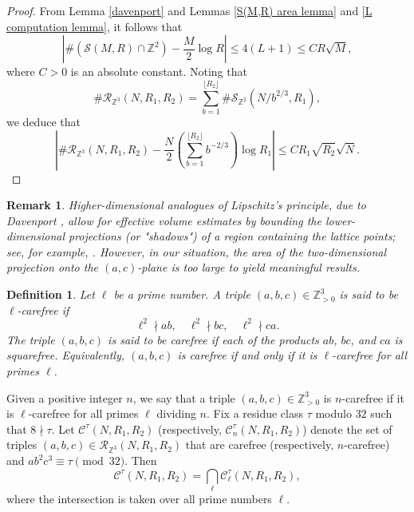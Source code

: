 \documentclass[table]{amsart}
\newtheorem{definition}[theorem]{Definition}
\newtheorem{remark}[theorem]{Remark}
\newcommand{\Z}{\mathbb{Z}}
\numberwithin{equation}{section}
\begin{document}
\begin{proof}
From Lemma \ref{davenport} and Lemmas \ref{S(M,R) area lemma} and \ref{L computation lemma}, it follows that
\[\left|\# \left(\mathcal{S}(M, R)\cap \Z^2\right)-\frac{M}{2}\log R\right|\leq 4(L+1)\leq  C R \sqrt{M},\] where $C>0$ is an absolute constant.
Noting that 
\[\# \mathcal{R}_{\Z^3}(N, R_1, R_2)=\sum_{b=1}^{\lfloor R_2\rfloor} \# \mathcal{S}_{\Z^2}(N/b^{2/3}, R_1),\]
we deduce that 
\[\left|\# \mathcal{R}_{\Z^3}(N, R_1, R_2)-\frac{N}{2}\left(\sum_{b=1}^{\lfloor R_2\rfloor}b^{-2/3}\right) \log R_1 \right|\leq C R_1\sqrt{R_2} \sqrt{N}.\]
\end{proof}
\begin{remark}
Higher-dimensional analogues of Lipschitz's principle, due to Davenport \cite{Davenportlemma}, allow for effective volume estimates by bounding the lower-dimensional projections (or "shadows") of a region containing the lattice points; see, for example, \cite[Corollary 6.13]{Hol22}. However, in our situation, the area of the two-dimensional projection onto the $(a,c)$-plane is too large to yield meaningful results.
\end{remark}
\begin{definition}\label{carefree definition}
Let $\ell$ be a prime number. A triple $(a,b,c)\in \Z_{>0}^3$ is said to be $\ell$-carefree if
$$
\ell^2 \nmid ab,\quad \ell^2 \nmid bc,\quad \ell^2 \nmid ca.
$$
\noindent The triple $(a,b,c)$ is said to be carefree if each of the products $ab$, $bc$, and $ca$ is squarefree. Equivalently, $(a,b,c)$ is carefree if and only if it is $\ell$-carefree for all primes $\ell$.
\end{definition}
\noindent Given a positive integer $n$, we say that a triple $(a,b,c) \in \Z_{>0}^3$ is $n$-carefree if it is $\ell$-carefree for all primes $\ell$ dividing $n$. Fix a residue class $\tau$ modulo $32$ such that $8\nmid \tau$. Let $\mathcal{C}^\tau(N, R_1, R_2)$ (respectively, $\mathcal{C}_n^\tau(N, R_1, R_2)$) denote the set of triples $(a,b,c) \in \mathcal{R}_{\Z^3}(N, R_1, R_2)$ that are carefree (respectively, $n$-carefree) and $ab^2c^3\equiv \tau\pmod{32}$. Then
$$
\mathcal{C}^\tau(N, R_1, R_2) = \bigcap_{\ell} \mathcal{C}_\ell^\tau(N, R_1, R_2),
$$
\noindent where the intersection is taken over all prime numbers $\ell$.
\end{document}
